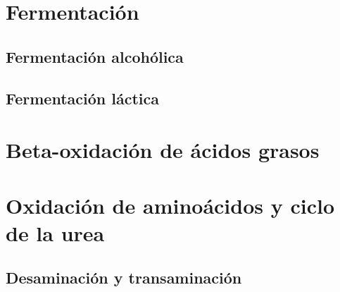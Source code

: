 \section{Fermentación}

\subsection{Fermentación alcohólica}

\subsection{Fermentación láctica}

\section{Beta-oxidación de ácidos grasos}



\section{Oxidación de aminoácidos y ciclo de la urea}

\subsection{Desaminación y transaminación}

